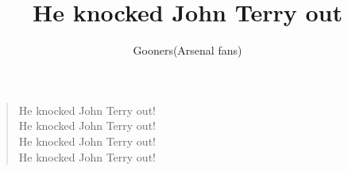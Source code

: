 \documentclass[a4paper,12pt]{article}
\title{He knocked John Terry out}
\author{Gooners(Arsenal fans)}
\date{}
\begin{document}
	
	\maketitle
	
	\begin{verse}
		
		He knocked John Terry out! \\
		He knocked John Terry out! \\
		He knocked John Terry out! \\
		He knocked John Terry out!
		
	\end{verse}
	
\end{document}
